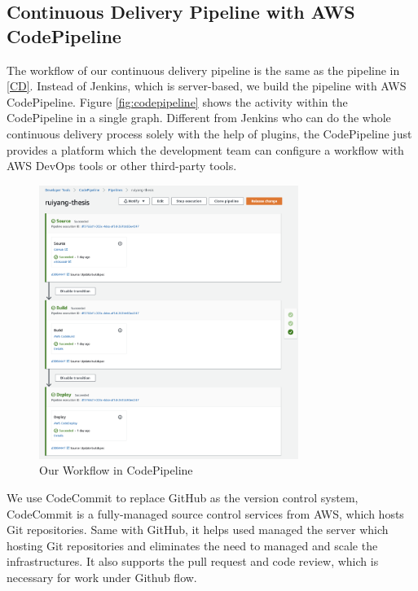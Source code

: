 \subsection{Continuous Delivery Pipeline with AWS CodePipeline}
\label{codedeploy}
The workflow of our continuous delivery pipeline is the same as the pipeline in \ref{CD}. Instead of Jenkins, which is server-based, we build the pipeline with AWS CodePipeline. Figure \ref{fig:codepipeline} shows the activity within the CodePipeline in a single graph. Different from Jenkins who can do the whole continuous delivery process solely with the help of plugins, the CodePipeline just provides a platform which the development team can configure a workflow with AWS DevOps tools or other third-party tools. 
\begin{figure}[h]
     \centering
     \includegraphics[width=0.75\textwidth]{pics/cp-interface.png}
     \caption{Our Workflow in CodePipeline}
     \label{fig:cp-edit}
    \end{figure}
\par
We use CodeCommit to replace GitHub as the version control system, CodeCommit is a fully-managed source control services \cite{AWSCodeC33:online} from AWS, which hosts Git repositories. Same with GitHub, it helps used managed the server which hosting Git repositories and eliminates the need to managed and scale the infrastructures. It also supports the pull request and code review, which is necessary for work under Github flow. 

